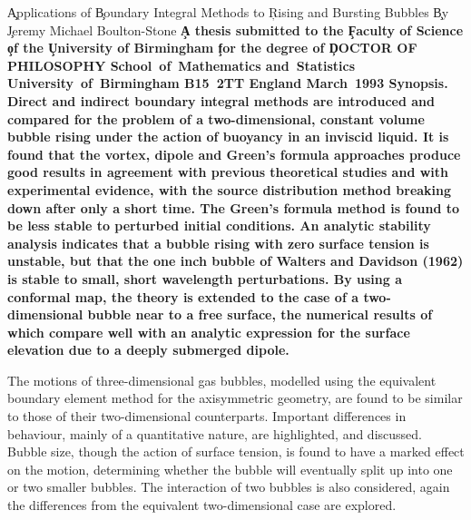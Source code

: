 %
\baselineskip 24pt
\vskip 3in
\bigrmb
\c{Applications of}
\c{Boundary Integral Methods to}
\c{Rising and Bursting Bubbles}
\vskip 5pt
\bigrm
\c{By}
\vskip 5pt
\c{Jeremy Michael Boulton-Stone}
\vskip 2in
\bf
\baselineskip 18pt
\c{A thesis submitted to the}
\c{Faculty of Science}
\c{of the}
\c{University of Birmingham}
\c{for the degree of}
\c{DOCTOR OF PHILOSOPHY}
\timesrm
\vskip 2in
\hskip 4in
\vbox{
\hbox{School of Mathematics}
\hbox{and Statistics}
\hbox{University of Birmingham}
\hbox{B15 2TT}
\hbox{England}
\vskip 5pt
\hbox{March 1993}
}
\pg
%
\c {\bf Synopsis.}
\vskip 5pt
Direct and indirect boundary integral methods are introduced and compared
for the problem of a two-dimensional, constant volume bubble rising 
under the action of buoyancy in
an inviscid liquid. It is found that the vortex, dipole and Green's formula
approaches produce good results
in agreement with previous theoretical studies and
with experimental evidence, with the source distribution 
method breaking down after only a short time. The Green's formula method is
found to be less stable to perturbed initial conditions. An analytic
stability analysis indicates  that  a 
bubble rising with zero surface tension is unstable, but that the one inch
bubble of Walters and Davidson (1962) is stable to small, short
wavelength perturbations.
By using a conformal map, the theory is extended to the case of a 
two-dimensional bubble near to a free surface, the numerical results 
of which compare 
well with an analytic expression for the surface  elevation  due  to  a 
deeply submerged dipole.

The motions of three-dimensional gas bubbles,
modelled using the equivalent
boundary element method for the axisymmetric geometry,  are found to be
similar to those of their two-dimensional counterparts. 
Important differences in behaviour, mainly of a quantitative nature, 
are highlighted, and discussed. 
Bubble size, though the action of surface tension, is found to have a marked
effect on the motion, determining whether the bubble will eventually split up
into one or two smaller bubbles.
The interaction of two bubbles is also considered, again the differences
from the equivalent two-dimensional case are explored.

